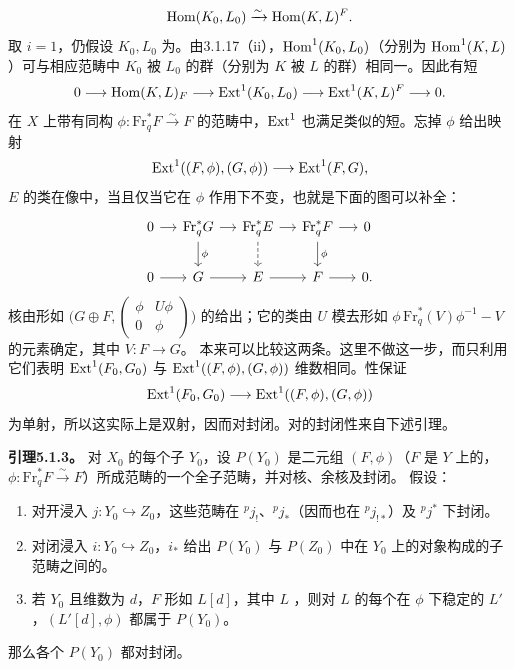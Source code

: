 \[
\operatorname{Hom}(K_0,L_0)\xrightarrow{\sim}\operatorname{Hom}(K,L)^F.
\]
取 $i=1$，仍假设 $K_0,L_0$ 为。由3.1.17（ii），$\operatorname{Hom}^1(K_0,L_0)$（分别为 $\operatorname{Hom}^1(K,L)$）可与相应范畴中 $K_0$ 被 $L_0$ 的群（分别为 $K$ 被 $L$ 的群）相同一。因此有短
\[
0\longrightarrow\operatorname{Hom}(K,L)_F\longrightarrow\operatorname{Ext}^1(K_0,L_0)\longrightarrow\operatorname{Ext}^1(K,L)^F\longrightarrow0.
\]
在 $X$ 上带有同构 $\phi:\mathrm{Fr}_q^*F\xrightarrow{\sim}F$ 的范畴中，$\operatorname{Ext}^1$ 也满足类似的短。忘掉 $\phi$ 给出映射
\[
\operatorname{Ext}^1((F,\phi),(G,\phi))\longrightarrow\operatorname{Ext}^1(F,G),
\]
 $E$ 的类在像中，当且仅当它在 $\phi$ 作用下不变，也就是下面的图可以补全：
\[
\begin{tikzcd}[ampersand replacement=\&,column sep=small]
0\arrow[r]\&\mathrm{Fr}_q^*G\arrow[r]\arrow[d,"{\phi}"]\&\mathrm{Fr}_q^*E\arrow[r]\arrow[d,dashed]\&\mathrm{Fr}_q^*F\arrow[r]\arrow[d,"{\phi}"]\&0\\
0\arrow[r]\&G\arrow[r]\&E\arrow[r]\&F\arrow[r]\&0.
\end{tikzcd}
\]
核由形如 $\bigl(G\oplus F,\left(\begin{smallmatrix}\phi&U\phi\\0&\phi\end{smallmatrix}\right)\bigr)$ 的给出；它的类由 $U$ 模去形如 $\phi\,\mathrm{Fr}_q^*(V)\phi^{-1}-V$ 的元素确定，其中 $V:F\to G$。
本来可以比较这两条。这里不做这一步，而只利用它们表明 $\operatorname{Ext}^1(F_0,G_0)$ 与 $\operatorname{Ext}^1((F,\phi),(G,\phi))$ 维数相同。性保证
\[
\operatorname{Ext}^1(F_0,G_0)\longrightarrow\operatorname{Ext}^1((F,\phi),(G,\phi))
\]
为单射，所以这实际上是双射，因而对封闭。对的封闭性来自下述引理。

\par\medskip\noindent\textbf{引理5.1.3。} 对 $X_0$ 的每个子 $Y_0$，设 $P(Y_0)$ 是二元组 $(F,\phi)$（$F$ 是 $Y$ 上的，$\phi:\mathrm{Fr}_q^*F\xrightarrow{\sim}F$）所成范畴的一个全子范畴，并对核、余核及封闭。
假设：
\begin{enumerate}[label=(\alph*)]
\item 对开浸入 $j:Y_0\hookrightarrow Z_0$，这些范畴在 ${}^pj_!$、${}^pj_*$（因而也在 ${}^pj_{!*}$）及 ${}^pj^*$ 下封闭。
\item 对闭浸入 $i:Y_0\hookrightarrow Z_0$，$i_*$ 给出 $P(Y_0)$ 与 $P(Z_0)$ 中在 $Y_0$ 上的对象构成的子范畴之间的。
\item 若 $Y_0$ 且维数为 $d$，$F$ 形如 $L[d]$，其中 $L$ ，则对 $L$ 的每个在 $\phi$ 下稳定的 $L'$，$(L'[d],\phi)$ 都属于 $P(Y_0)$。
\end{enumerate}
那么各个 $P(Y_0)$ 都对封闭。

